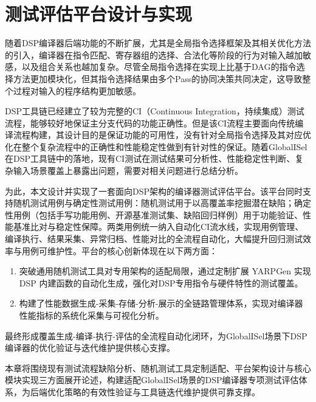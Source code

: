 \chapter{测试评估平台设计与实现}
随着DSP编译器后端功能的不断扩展，尤其是全局指令选择框架及其相关优化方法的引入，编译器在指令匹配、寄存器组的选择、合法化等阶段的行为对输入越加敏感，以及组合关系也越加复杂。尽管全局指令选择在实现上比基于DAG的指令选择方法更加模块化，但其指令选择结果由多个Pass的协同决策共同决定，这导致整个过程对输入的程序结构更加敏感。

\par

DSP工具链已经建立了较为完整的CI（Continuous Integration，持续集成）测试流程，能够较好地保证主分支代码的功能正确性。但是该CI流程主要面向传统编译流程构建，其设计目的是保证功能的可用性，没有针对全局指令选择及其对应优化在整个复杂流程中的正确性和性能稳定性做到有针对性的保证。随着GlobalISel在DSP工具链中的落地，现有CI测试在测试结果可分析性、性能稳定性判断、复杂输入场景覆盖上暴露出问题，需要对相关问题进行总结分析。

\par

为此，本文设计并实现了一套面向DSP架构的编译器测试评估平台。该平台同时支持随机测试用例与确定性测试用例：随机测试用于以高覆盖率挖掘潜在缺陷；确定性用例（包括手写功能用例、开源基准测试集、缺陷回归样例）用于功能验证、性能基准比对与稳定性保障。两类用例统一纳入自动化CI流水线，实现用例管理、编译执行、结果采集、异常归档、性能对比的全流程自动化，大幅提升回归测试效率与用例可维护性。平台的核心创新体现在以下两方面：

\begin{enumerate}
	\item
	突破通用随机测试工具对专用架构的适配局限，通过定制扩展 YARPGen 实现 DSP 内建函数的自动化生成，强化对DSP专用指令与硬件特性的测试覆盖。
	
	\item
	构建了性能数据生成-采集-存储-分析-展示的全链路管理体系，实现对编译器性能指标的系统化采集与可视化分析。
	
\end{enumerate}

最终形成覆盖生成-编译-执行-评估的全流程自动化闭环，为GlobalISel场景下DSP编译器的优化验证与迭代维护提供核心支撑。

\par

本章将围绕现有测试流程缺陷分析、随机测试工具定制适配、平台架构设计与核心模块实现三方面展开论述，构建适配GlobalISel场景的DSP编译器专项测试评估体系，为后端优化策略的有效性验证与工具链迭代维护提供可靠支撑。


